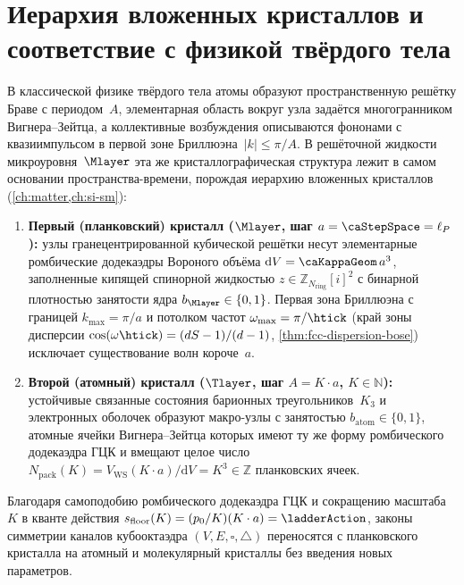 \section{Иерархия вложенных кристаллов и соответствие с физикой твёрдого тела}

В классической физике твёрдого тела атомы образуют пространственную решётку Браве с периодом~$A$,
элементарная область вокруг узла задаётся многогранником Вигнера--Зейтца,
а коллективные возбуждения описываются фононами с квазиимпульсом в первой зоне Бриллюэна~$|k|\le \pi/A$.
В решёточной жидкости микроуровня~$\Mlayer$ эта же кристаллографическая структура лежит в самом основании пространства-времени,
порождая иерархию вложенных кристаллов (\cref{ch:matter,ch:si-sm}):
\begin{enumerate}[leftmargin=*]
\item \textbf{Первый (планковский) кристалл ($\Mlayer$, шаг $a = \caStepSpace = \ell_P$):}
  узлы гранецентрированной кубической решётки несут элементарные ромбические додекаэдры Вороного объёма $\mathrm{d}V = \caKappaGeom\,a^3$,
  заполненные кипящей спинорной жидкостью $z\in\mathbb{Z}_{N_{\mathrm{ring}}}[i]^2$ с бинарной плотностью занятости ядра $b_{\Mlayer}\in\{0,1\}$.
  Первая зона Бриллюэна с границей $k_{\max} = \pi/a$ и потолком частот
  $\omega_{\max} = \pi/\htick$ (край зоны дисперсии
  $\cos(\omega\htick) = (dS-1)/(d-1)$, \cref{thm:fcc-dispersion-bose})
  исключает существование волн короче~$a$.
\item \textbf{Второй (атомный) кристалл ($\Tlayer$, шаг $A = K\cdot a$, $K\in\mathbb{N}$):}
  устойчивые связанные состояния барионных треугольников~$K_3$ и электронных оболочек образуют макро-узлы с занятостью $b_{\mathrm{atom}}\in\{0,1\}$,
  атомные ячейки Вигнера--Зейтца которых имеют ту же форму ромбического додекаэдра ГЦК и вмещают целое число $N_{\mathrm{pack}}(K) = V_{\mathrm{WS}}(K\cdot a)/\mathrm{d}V = K^3\in\mathbb{Z}$ планковских ячеек.
\end{enumerate}

Благодаря самоподобию ромбического додекаэдра ГЦК и сокращению масштаба~$K$ в кванте действия $s_{\mathrm{floor}}(K) = (p_0/K)(K\cdot a) = \ladderAction$,
законы симметрии каналов кубооктаэдра $(V,E,\square,\triangle)$ переносятся с планковского кристалла на атомный и молекулярный кристаллы без введения новых параметров.
